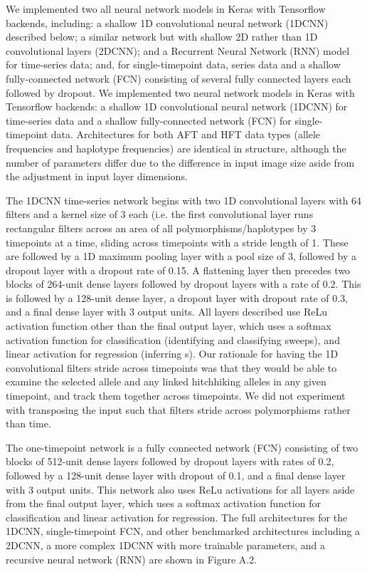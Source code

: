 We implemented two all neural network models in Keras \cite{cholletKeras2015} with Tensorflow backends, including: a shallow 1D convolutional neural network (1DCNN) described below; a similar network but with shallow 2D rather than 1D convolutional layers (2DCNN); and a Recurrent Neural Network (RNN) model for time-series data; and, for single-timepoint data, series data and a shallow fully-connected network (FCN) consisting of several fully connected layers each followed by dropout. We implemented two neural network models in Keras \cite{cholletKeras2015} with Tensorflow backends: a shallow 1D convolutional neural network (1DCNN) for time-series data and a shallow fully-connected network (FCN) for single-timepoint data. Architectures for both AFT and HFT data types (allele frequencies and haplotype frequencies) are identical in structure, although the number of parameters differ due to the difference in input image size aside from the adjustment in input layer dimensions. 

The 1DCNN time-series network begins with two 1D convolutional layers with 64 filters and a kernel size of 3 each (i.e. the first convolutional layer runs rectangular filters across an area of all polymorphisms/haplotypes by 3 timepoints at a time, sliding across timepoints with a stride length of 1. These are followed by a 1D maximum pooling layer with a pool size of 3, followed by a dropout layer with a dropout rate of 0.15. A flattening layer then precedes two blocks of 264-unit dense layers followed by dropout layers with a rate of 0.2. This is followed by a 128-unit dense layer, a dropout layer with dropout rate of 0.3, and a final dense layer with 3 output units. All layers described use ReLu activation function other than the final output layer, which uses a softmax activation function for classification (identifying and classifying sweeps), and linear activation for regression (inferring s). Our rationale for having the 1D convolutional filters stride across timepoints was that they would be able to examine the selected allele and any linked hitchhiking alleles in any given timepoint, and track them together across timepoints. We did not experiment with transposing the input such that filters stride across polymorphisms rather than time. 

The one-timepoint network is a fully connected network (FCN) consisting of two blocks of 512-unit dense layers followed by dropout layers with rates of 0.2, followed by a 128-unit dense layer with dropout of 0.1, and a final dense layer with 3 output units. This network also uses ReLu activations for all layers aside from the final output layer, which uses a softmax activation function for classification and linear activation for regression.
The full architectures for the 1DCNN, single-timepoint FCN, and other benchmarked architectures including a 2DCNN, a more complex 1DCNN with more trainable parameters, and a recursive neural network (RNN) are shown in Figure A.2. \\ 
 
